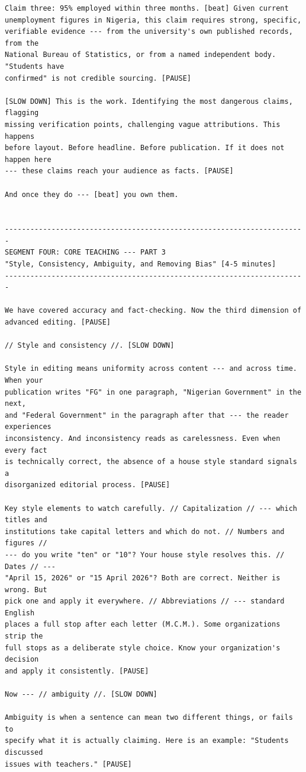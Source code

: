 {\begin{Verbatim}
Claim three: 95% employed within three months. [beat] Given current
unemployment figures in Nigeria, this claim requires strong, specific,
verifiable evidence --- from the university's own published records, from the
National Bureau of Statistics, or from a named independent body. "Students have
confirmed" is not credible sourcing. [PAUSE]

[SLOW DOWN] This is the work. Identifying the most dangerous claims, flagging
missing verification points, challenging vague attributions. This happens
before layout. Before headline. Before publication. If it does not happen here
--- these claims reach your audience as facts. [PAUSE]

And once they do --- [beat] you own them.


-----------------------------------------------------------------------
SEGMENT FOUR: CORE TEACHING --- PART 3
"Style, Consistency, Ambiguity, and Removing Bias" [4-5 minutes]
-----------------------------------------------------------------------

We have covered accuracy and fact-checking. Now the third dimension of
advanced editing. [PAUSE]

// Style and consistency //. [SLOW DOWN]

Style in editing means uniformity across content --- and across time. When your
publication writes "FG" in one paragraph, "Nigerian Government" in the next,
and "Federal Government" in the paragraph after that --- the reader experiences
inconsistency. And inconsistency reads as carelessness. Even when every fact
is technically correct, the absence of a house style standard signals a
disorganized editorial process. [PAUSE]

Key style elements to watch carefully. // Capitalization // --- which titles and
institutions take capital letters and which do not. // Numbers and figures //
--- do you write "ten" or "10"? Your house style resolves this. // Dates // ---
"April 15, 2026" or "15 April 2026"? Both are correct. Neither is wrong. But
pick one and apply it everywhere. // Abbreviations // --- standard English
places a full stop after each letter (M.C.M.). Some organizations strip the
full stops as a deliberate style choice. Know your organization's decision
and apply it consistently. [PAUSE]

Now --- // ambiguity //. [SLOW DOWN]

Ambiguity is when a sentence can mean two different things, or fails to
specify what it is actually claiming. Here is an example: "Students discussed
issues with teachers." [PAUSE]


\end{Verbatim}}
